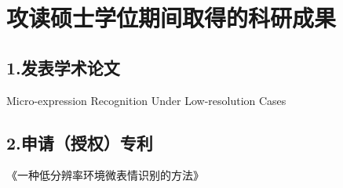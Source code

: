 \chapter{攻读硕士学位期间取得的科研成果}\label{achievement}


\section*{1.发表学术论文}

Micro-expression Recognition Under Low-resolution Cases


\section*{2.申请（授权）专利}

《一种低分辨率环境微表情识别的方法》




\cleardoublepage[plain]%
